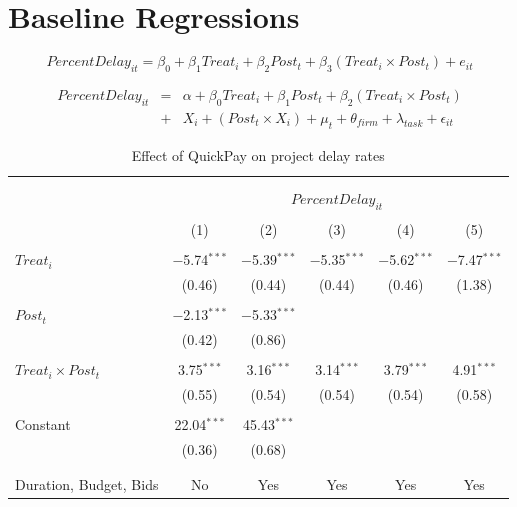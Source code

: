 \documentclass[
]{article}
\begin{document}
\hypertarget{baseline-regressions}{%
\section{Baseline Regressions}\label{baseline-regressions}}

\[ PercentDelay_{it} = \beta_0 + \beta_1 Treat_i + \beta_2 Post_t + \beta_3 (Treat_i \times Post_t) + e_{it}\]

\[ \begin{aligned} PercentDelay_{it} &=& \alpha+\beta_0 Treat_i + \beta_1 Post_t + \beta_2 (Treat_i \times Post_t)\\
&+&  X_i + (Post_t \times X_i) + \mu_t + \theta_{firm} + \lambda_{task}+ \epsilon_{it}
\end{aligned}\]

\begin{table}[H] \centering 
  \caption{Effect of QuickPay on project delay rates} 
  \label{} 
\small 
\begin{tabular}{@{\extracolsep{-2pt}}lccccc} 
\\[-1.8ex]\hline 
\hline \\[-1.8ex] 
\\[-1.8ex] & \multicolumn{5}{c}{$PercentDelay_{it}$} \\ 
\\[-1.8ex] & (1) & (2) & (3) & (4) & (5)\\ 
\hline \\[-1.8ex] 
 $Treat_i$ & $-$5.74$^{***}$ & $-$5.39$^{***}$ & $-$5.35$^{***}$ & $-$5.62$^{***}$ & $-$7.47$^{***}$ \\ 
  & (0.46) & (0.44) & (0.44) & (0.46) & (1.38) \\ 
  & & & & & \\ 
 $Post_t$ & $-$2.13$^{***}$ & $-$5.33$^{***}$ &  &  &  \\ 
  & (0.42) & (0.86) &  &  &  \\ 
  & & & & & \\ 
 $Treat_i \times Post_t$ & 3.75$^{***}$ & 3.16$^{***}$ & 3.14$^{***}$ & 3.79$^{***}$ & 4.91$^{***}$ \\ 
  & (0.55) & (0.54) & (0.54) & (0.54) & (0.58) \\ 
  & & & & & \\ 
 Constant & 22.04$^{***}$ & 45.43$^{***}$ &  &  &  \\ 
  & (0.36) & (0.68) &  &  &  \\ 
  & & & & & \\ 
\hline \\[-1.8ex] 
Duration, Budget, Bids & No & Yes & Yes & Yes & Yes \\ 

\end{tabular}
\end{table}
\end{document}
